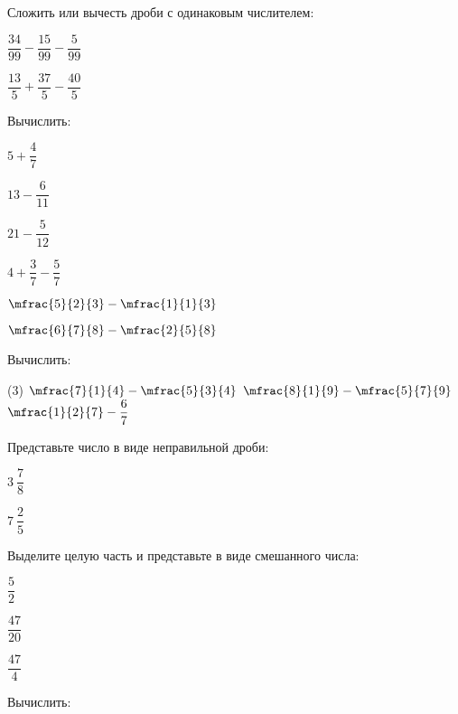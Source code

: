 %
%

\begin{class}[number=1]
	\begin{listofex}
		\item Сложить или вычесть дроби с одинаковым числителем:
		\begin{enumcols}[itemcolumns=2]
			\item \( \dfrac{34}{99}-\dfrac{15}{99}-\dfrac{5}{99} \)
			\item \( \dfrac{13}{5}+\dfrac{37}{5}-\dfrac{40}{5} \)
		\end{enumcols}
		\item Вычислить:
		\begin{enumcols}[itemcolumns=4]
			\item \( 5+\dfrac{4}{7} \)
			\item \( 13-\dfrac{6}{11} \)
			\item \( 21-\dfrac{5}{12} \)
			\item \( 4+\dfrac{3}{7}-\dfrac{5}{7} \)
			\item \( \mfrac{5}{2}{3}-\mfrac{1}{1}{3} \)
			\item \( \mfrac{6}{7}{8}-\mfrac{2}{5}{8} \)
		\end{enumcols}
		\item Вычислить:
		\begin{tasks}(3)
			\task \( \mfrac{7}{1}{4}-\mfrac{5}{3}{4} \)
			\task \( \mfrac{8}{1}{9}-\mfrac{5}{7}{9} \)
			\task \( \mfrac{1}{2}{7}-\dfrac{6}{7} \)
		\end{tasks}
			\item Представьте число в виде неправильной дроби:
		\begin{enumcols}[itemcolumns=2]
			\item \( 3\:\dfrac{7}{8} \)
			\item \( 7\:\dfrac{2}{5} \)
		\end{enumcols}
		\item Выделите целую часть и представьте в виде смешанного числа:
		\begin{enumcols}[itemcolumns=3]
			\item \( \dfrac{5}{2} \)
			\item \( \dfrac{47}{20} \)
			\item \( \dfrac{47}{4} \)
		\end{enumcols}
		\item Вычислить:
		\begin{enumcols}[itemcolumns=4]

\end{enumcols}
\end{listofex}
\end{class}
